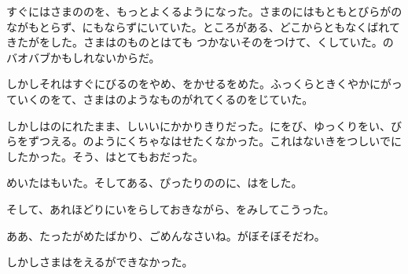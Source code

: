 すぐにはさまののを、もっとよくるようになった。さまのにはもともとびらがのながもとらず、にもならずにいていた。ところがある、どこからともなくばれてきたがをした。さまはのものとはても つかないそのをつけて、くしていた。のバオバブかもしれないからだ。

しかしそれはすぐにびるのをやめ、をかせるをめた。ふっくらときくやかにがっていくのをて、さまはのようなものがれてくるのをじていた。

しかしはのにれたまま、しいいにかかりきりだった。にをび、ゆっくりをい、びらをずつえる。のようにくちゃなはせたくなかった。これはないきをつしいでにしたかった。そう、はとてもおだった。

めいたはもいた。そしてある、ぴったりののに、はをした。

そして、あれほどりにいをらしておきながら、をみしてこうった。

ああ、たったがめたばかり、ごめんなさいね。がぼそぼそだわ。

しかしさまはをえるができなかった。

